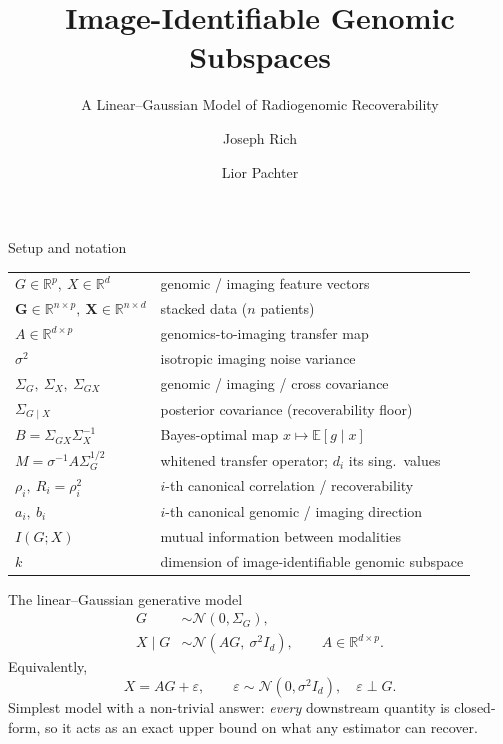\documentclass[aspectratio=169,12pt]{beamer}
\title{Image-Identifiable Genomic Subspaces}
\subtitle{A Linear--Gaussian Model of Radiogenomic Recoverability}
\author{Joseph Rich \and Lior Pachter}
\date{}
\newcommand{\R}{\mathbb{R}}
\newcommand{\E}{\mathbb{E}}
\newcommand{\N}{\mathcal{N}}
\newcommand{\Sg}{\Sigma_{G}}
\newcommand{\Sx}{\Sigma_{X}}
\newcommand{\Sgx}{\Sigma_{GX}}
\newcommand{\Sgcx}{\Sigma_{G\mid X}}
\begin{document}
\begin{frame}
  \titlepage
\end{frame}

\begin{frame}{Setup and notation}
  \small
  \centering
  \renewcommand{\arraystretch}{1.25}
  \begin{tabular}{ll}
    \toprule
    $G \in \R^p,\ X \in \R^d$ & genomic / imaging feature vectors\\
    $\mathbf{G}\in\R^{n\times p},\ \mathbf{X}\in\R^{n\times d}$ & stacked data ($n$ patients)\\
    $A \in \R^{d\times p}$ & genomics-to-imaging transfer map\\
    $\sigma^2$ & isotropic imaging noise variance\\
    $\Sg,\ \Sx,\ \Sgx$ & genomic / imaging / cross covariance\\
    $\Sgcx$ & posterior covariance (recoverability floor)\\
    $B = \Sgx \Sx^{-1}$ & Bayes-optimal map $x \mapsto \E[g\mid x]$\\
    $M = \sigma^{-1} A \Sg^{1/2}$ & whitened transfer operator; $d_i$ its sing.\ values\\
    $\rho_i,\ R_i = \rho_i^2$ & $i$-th canonical correlation / recoverability\\
    $a_i,\ b_i$ & $i$-th canonical genomic / imaging direction\\
    $I(G;X)$ & mutual information between modalities\\
    $k$ & dimension of image-identifiable genomic subspace\\
    \bottomrule
  \end{tabular}
\end{frame}

\begin{frame}{The linear--Gaussian generative model}
  \begin{align*}
    G &\sim \N(0, \Sg),\\[2pt]
    X \mid G &\sim \N(A G,\ \sigma^2 I_d), \qquad A \in \R^{d \times p}.
  \end{align*}
  \vfill
  Equivalently,
  \[
    X = A G + \varepsilon, \qquad
    \varepsilon \sim \N(0, \sigma^2 I_d), \quad \varepsilon \perp G.
  \]
  \vfill
  \footnotesize
  Simplest model with a non-trivial answer: \emph{every} downstream quantity
  is closed-form, so it acts as an exact upper bound on what any estimator can recover.
\end{frame}
\end{document}
